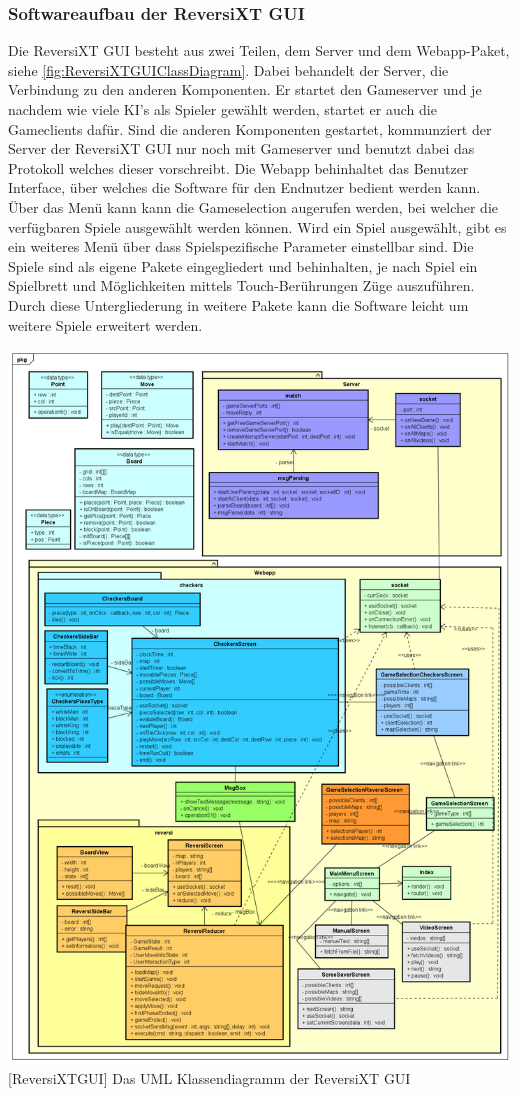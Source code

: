 \documentclass[12pt,a4paper,bibliography=totocnumbered,listof=totocnumbered]{article}
\begin{document}
\subsubsection{Softwareaufbau der ReversiXT GUI}
Die ReversiXT GUI besteht aus zwei Teilen, dem Server und dem Webapp-Paket, siehe \ref{fig:ReversiXTGUIClassDiagram}. 
Dabei behandelt der Server, die Verbindung zu den anderen
Komponenten. Er startet den Gameserver und je nachdem wie viele KI's als Spieler gewählt werden, startet er auch die Gameclients dafür.
Sind die anderen Komponenten gestartet, kommunziert der Server der ReversiXT GUI nur noch mit Gameserver und benutzt dabei das Protokoll
welches dieser vorschreibt. Die Webapp behinhaltet das Benutzer Interface, über welches die Software für den Endnutzer bedient werden kann.
Über das Menü kann kann die Gameselection augerufen werden, bei welcher die verfügbaren Spiele ausgewählt werden können.
Wird ein Spiel ausgewählt, gibt es ein weiteres Menü über dass Spielspezifische Parameter einstellbar sind. 
Die Spiele sind als eigene Pakete eingegliedert und behinhalten, je nach Spiel ein Spielbrett und Möglichkeiten mittels Touch-Berührungen
Züge auszuführen. Durch diese Untergliederung in weitere Pakete kann die Software leicht um weitere Spiele erweitert werden.

\vspace{1em}
\begin{minipage}{\linewidth}
	\centering
	\includegraphics[width=0.9\linewidth]{pics/ReversiXTGUIClassDiagramm.png}
	[ReversiXTGUI]{ Das UML Klassendiagramm der ReversiXT GUI }
	\label{fig:ReversiXTGUIClassDiagram}
\end{minipage}
\end{document}
